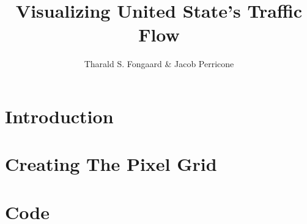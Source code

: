 \documentclass[12pt,lot,lof]{puthesis_undergraduate}
\title{Visualizing United State's Traffic Flow}
\author{Tharald S. Fongaard \& Jacob Perricone}
\begin{document}
\chapter{Introduction}\label{ch:intro}  %

\chapter{Creating The Pixel Grid}  %


\appendix
\chapter{Code}




 \label{bib}
\end{document}
